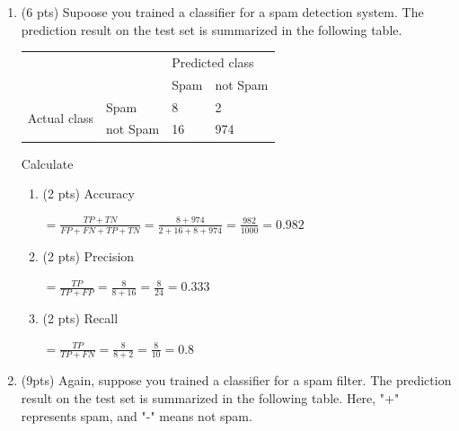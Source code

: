 \documentclass[a4paper]{article}
\theoremstyle{definition}
\newenvironment{soln}{
    \leavevmode\color{blue}\ignorespaces
}{}
\begin{document}
\begin{enumerate}
	\item (6 pts) Supoose you trained a classifier for a spam detection system. The prediction result on the test set is summarized in the following table.
	      \begin{center}
		      \begin{tabular}{l l | l l}
			                                    &          & \multicolumn{2}{l}{Predicted class}            \\
			                                    &          & Spam                                & not Spam \\
			      \hline
			      \multirow{2}{*}{Actual class} & Spam     & 8                                   & 2        \\
			                                    & not Spam & 16                                  & 974
		      \end{tabular}
	      \end{center}

	      Calculate
	      \begin{enumerate}
		      \item (2 pts) Accuracy
		            \begin{soln}
			            $= \frac{TP + TN}{FP + FN + TP + TN} = \frac{8 + 974}{2 + 16 + 8 + 974} = \frac{982}{1000} = 0.982$
		            \end{soln}
		      \item (2 pts) Precision
		            \begin{soln}
			            $= \frac{TP}{TP + FP} = \frac{8}{8 + 16} = \frac{8}{24} = 0.333$
		            \end{soln}
		      \item (2 pts) Recall
		            \begin{soln}
			            $= \frac{TP}{TP + FN} = \frac{8}{8 + 2} = \frac{8}{10} = 0.8$
		            \end{soln}
	      \end{enumerate}


	\item (9pts) Again, suppose you trained a classifier for a spam filter. The prediction result on the test set is summarized in the following table. Here, "+" represents spam, and "-" means not spam.


\end{enumerate}
\end{document}

